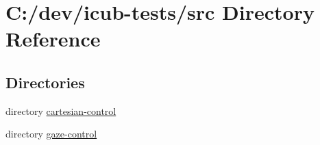 \section{C\+:/dev/icub-\/tests/src Directory Reference}
\label{dir_68267d1309a1af8e8297ef4c3efbcdba}
\subsection*{Directories}
\begin{DoxyCompactItemize}
\item 
directory \hyperlink{dir_684cb237cc589112c257fb2b82bbd35f}{cartesian-\/control}
\item 
directory \hyperlink{dir_bb6085b5660958491f908beff56f4e11}{gaze-\/control}
\end{DoxyCompactItemize}
